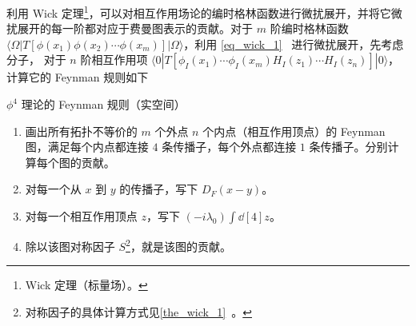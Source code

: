 

利用 Wick 定理\footnote{Wick 定理（标量场）。}，可以对相互作用场论的编时格林函数进行微扰展开，并将它微扰展开的每一阶都对应于费曼图表示的贡献。对于 $m$ 阶编时格林函数 $\langle \Omega|T[\phi(x_1)\phi(x_2)\cdots \phi(x_m)]|\Omega\rangle$，利用 \autoref{eq_wick_1}~ 进行微扰展开，先考虑分子，
对于 $n$ 阶相互作用项 $\langle 0| T[\phi_I(x_1)\cdots \phi_I(x_m) H_I(z_1)\cdots H_I(z_n)]|0\rangle$，计算它的 Feynman 规则如下
\begin{theorem}{$\phi^4$ 理论的 Feynman 规则（实空间）}
\begin{enumerate}
\item 画出所有拓扑不等价的 $m$ 个外点 $n$ 个内点（相互作用顶点）的 Feynman 图，满足每个内点都连接 $4$ 条传播子，每个外点都连接 $1$ 条传播子。分别计算每个图的贡献。
\item 对每一个从 $x$ 到 $y$ 的传播子，写下 $D_F(x-y)$。
\item 对每一个相互作用顶点 $z$，写下 $(-i\lambda_0)\int \dd[4]z$。
\item 除以该图对称因子 $S$\footnote{对称因子的具体计算方式见\autoref{the_wick_1}~。}，就是该图的贡献。
\end{enumerate}
\end{theorem}
